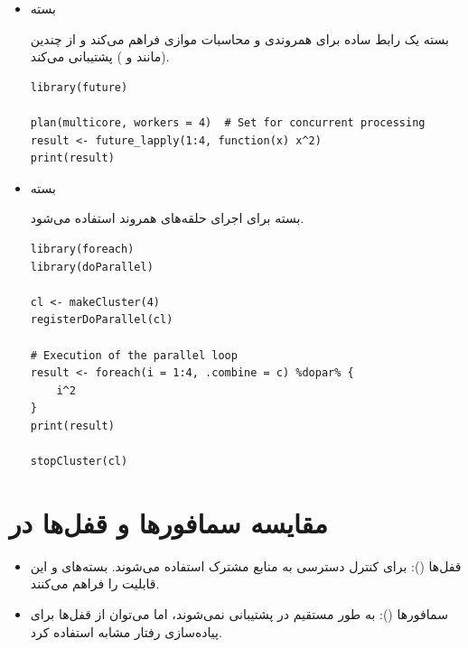 \documentclass[11pt, a4paper, oneside]{book}
\begin{document}
			\begin{itemize}
				
				\item {\large بسته } \par
				بسته  یک رابط ساده برای همروندی و محاسبات موازی فراهم می‌کند و از چندین  (مانند  و ) پشتیبانی می‌کند.
				
				\begin{latin}
					\begin{lstlisting}[caption={\lr{future package}}] 
library(future)

plan(multicore, workers = 4)  # Set for concurrent processing
result <- future_lapply(1:4, function(x) x^2)
print(result)

					\end{lstlisting}
				\end{latin}
				
				\item {\large بسته } \par
				بسته  برای اجرای حلقه‌های همروند استفاده می‌شود.
			
				\begin{latin}
					\begin{lstlisting}[caption={\lr{foreach package}}] 
library(foreach)
library(doParallel)

cl <- makeCluster(4)
registerDoParallel(cl)

# Execution of the parallel loop
result <- foreach(i = 1:4, .combine = c) %dopar% {
	i^2
}
print(result)

stopCluster(cl)

					\end{lstlisting}
				\end{latin}
				
			\end{itemize}
		
		\section{مقایسه سمافورها و قفل‌ها در }
		
			\begin{itemize}
				
				\item {\large قفل‌ها ()}:
				برای کنترل دسترسی به منابع مشترک استفاده می‌شوند. بسته‌های  و  این قابلیت را فراهم می‌کنند.
				
				\item {\large سمافورها ()}: 
				به طور مستقیم در  پشتیبانی نمی‌شوند، اما می‌توان از قفل‌ها برای پیاده‌سازی رفتار مشابه استفاده کرد.
				
			\end{itemize}
		
\end{document}
